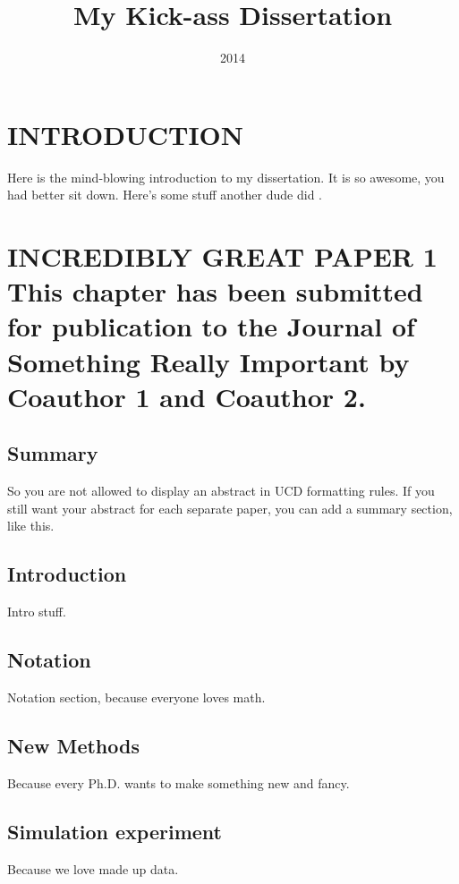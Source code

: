 \documentclass[english]{ucdenver-dissertation}
\title{My Kick-ass Dissertation}
\date{2014}
\makeatletter
\let\SF@@footnote\footnote
\def\footnote{\ifx\protect\@typeset@protect
    \expandafter\SF@@footnote
  \else
    \expandafter\SF@gobble@opt
  \fi
}
\edef\SF@gobble@opt{\noexpand\protect
  \expandafter\noexpand\csname SF@gobble@opt \endcsname}
\makeatother
\begin{document}
\chapter{INTRODUCTION}

Here is the mind-blowing introduction to my dissertation.  It is so awesome, you
had better sit down.  Here's some stuff another dude did \citep{article_2007}.

\lipsum

\chapter{INCREDIBLY GREAT PAPER 1%
\footnote{This chapter has been submitted for publication to the Journal of
Something Really Important by Coauthor 1 and Coauthor 2.%
}}


\section{Summary}

So you are not allowed to display an abstract in UCD formatting rules.
If you still want your abstract for each separate paper, you can add a summary
section, like this. \blindtext

\section{Introduction}

Intro stuff. \lipsum[2]

\section{Notation}

Notation section, because everyone loves math. \lipsum[3]

\section{New Methods}

Because every Ph.D. wants to make something new and fancy.

\lipsum


\section{Simulation experiment}

Because we love made up data.

\Blindtext
\end{document}

